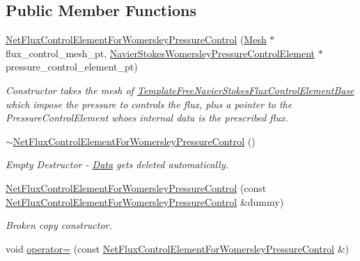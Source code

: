 \subsection*{Public Member Functions}
\begin{DoxyCompactItemize}
\item 
\hyperlink{classoomph_1_1NetFluxControlElementForWomersleyPressureControl_a395d5cf74e6e8c4dc581b52048963f38}{Net\+Flux\+Control\+Element\+For\+Womersley\+Pressure\+Control} (\hyperlink{classoomph_1_1Mesh}{Mesh} $\ast$flux\+\_\+control\+\_\+mesh\+\_\+pt, \hyperlink{classoomph_1_1NavierStokesWomersleyPressureControlElement}{Navier\+Stokes\+Womersley\+Pressure\+Control\+Element} $\ast$pressure\+\_\+control\+\_\+element\+\_\+pt)
\begin{DoxyCompactList}\small\item\em Constructor takes the mesh of \hyperlink{classoomph_1_1TemplateFreeNavierStokesFluxControlElementBase}{Template\+Free\+Navier\+Stokes\+Flux\+Control\+Element\+Base} which impose the pressure to controls the flux, plus a pointer to the Pressure\+Control\+Element whoes internal data is the prescribed flux. \end{DoxyCompactList}\item 
\hyperlink{classoomph_1_1NetFluxControlElementForWomersleyPressureControl_a6b7c6f8529d0194db68ae1202c9fa100}{$\sim$\+Net\+Flux\+Control\+Element\+For\+Womersley\+Pressure\+Control} ()
\begin{DoxyCompactList}\small\item\em Empty Destructor -\/ \hyperlink{classoomph_1_1Data}{Data} gets deleted automatically. \end{DoxyCompactList}\item 
\hyperlink{classoomph_1_1NetFluxControlElementForWomersleyPressureControl_a0c105f9f6451a881079e3198b51a5593}{Net\+Flux\+Control\+Element\+For\+Womersley\+Pressure\+Control} (const \hyperlink{classoomph_1_1NetFluxControlElementForWomersleyPressureControl}{Net\+Flux\+Control\+Element\+For\+Womersley\+Pressure\+Control} \&dummy)
\begin{DoxyCompactList}\small\item\em Broken copy constructor. \end{DoxyCompactList}\item 
void \hyperlink{classoomph_1_1NetFluxControlElementForWomersleyPressureControl_a499dc308316bda2ce079d89773562418}{operator=} (const \hyperlink{classoomph_1_1NetFluxControlElementForWomersleyPressureControl}{Net\+Flux\+Control\+Element\+For\+Womersley\+Pressure\+Control} \&)

\end{DoxyCompactItemize}
